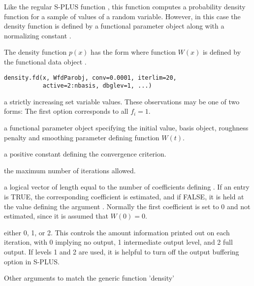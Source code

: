 \begin{Description}\relax
Like the regular S-PLUS function , this function
computes a probability density function for a sample of values of a
random variable.  However, in this case the density function is defined
by a functional parameter object  along with a normalizing
constant .

The density function $p(x)$ has the form
where function $W(x)$ is defined by the functional data object
.
\end{Description}
\begin{Usage}
\begin{verbatim}
density.fd(x, WfdParobj, conv=0.0001, iterlim=20,
           active=2:nbasis, dbglev=1, ...)
\end{verbatim}
\end{Usage}
\begin{Arguments}
\begin{ldescription}
\item[\code{x}] a strictly increasing set variable values.
These observations may be one of two forms:
The first option corresponds to all $f_i = 1$.

\item[\code{WfdParobj}] a functional parameter object specifying the initial
value, basis object, roughness penalty and smoothing
parameter defining function $W(t).$

\item[\code{conv}] a positive constant defining the convergence criterion.

\item[\code{iterlim}] the maximum number of iterations allowed.

\item[\code{active}] a logical vector of length equal to the number of coefficients
defining . If an entry is TRUE, the corresponding
coefficient is estimated, and if FALSE, it is held at the value defining the
argument .  Normally the first coefficient is set to 0
and not estimated, since it is assumed that $W(0) = 0$.

\item[\code{dbglev}] either 0, 1, or 2.  This controls the amount information printed out on
each iteration, with 0 implying no output, 1 intermediate output level,
and 2 full output.  If levels 1 and 2 are used, it is helpful to
turn off the output buffering option in S-PLUS.

\item[\code{...}] Other arguments to match the generic function 'density'
\end{ldescription}
\end{Arguments}
